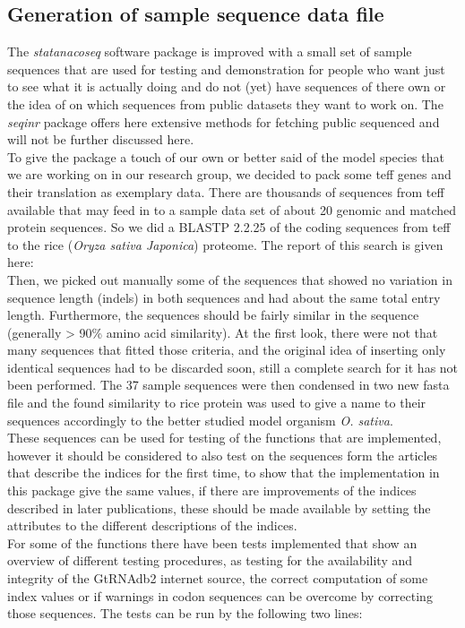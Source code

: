 \subsection{Generation of sample sequence data file}
The \textit{statanacoseq} software package is improved with a small set of sample sequences that are used for testing and demonstration for people who want just to see what it is actually doing and do not (yet) have sequences of there own or the idea of on which sequences from public datasets they want to work on. The \textit{seqinr} package offers here extensive methods for fetching public sequenced and will not be further discussed here. \\
To give the package a touch of our own or better said of the model species that we are working on in our research group, we decided to pack some teff genes and their translation as exemplary data. There are thousands of sequences from teff available that may feed in to a sample data set of about 20 genomic and matched protein sequences. So we did a BLASTP 2.2.25 of the coding sequences from teff to the rice (\textit{Oryza sativa Japonica}) proteome. The report of this search is given here:\\
  
Then, we picked out manually some of the sequences that showed no variation in sequence length (indels) in both sequences and had about the same total entry length. Furthermore, the sequences should be fairly similar in the sequence (generally > 90\% amino acid similarity). At the first look, there were not that many sequences that fitted those criteria, and the original idea of inserting only identical sequences had to be discarded soon, still a complete search for it has not been performed. The 37 sample sequences were then condensed in two new fasta file and the found similarity to rice protein was used to give a name to their sequences accordingly to the better studied model organism \textit{O. sativa}. \\
These sequences can be used for testing of the functions that are implemented, however it should be considered to also test on the sequences form the articles that describe the indices for the first time, to show that the implementation in this package give the same values, if there are improvements of the indices described in later publications, these should be made available by setting the attributes to the different descriptions of the indices. \\
For some of the functions there have been tests implemented that show an overview of different testing procedures, as testing for the availability and integrity of the GtRNAdb2 internet source, the correct computation of some index values or if warnings in codon sequences can be overcome by correcting those sequences. The tests can be run by the following two lines:
  


